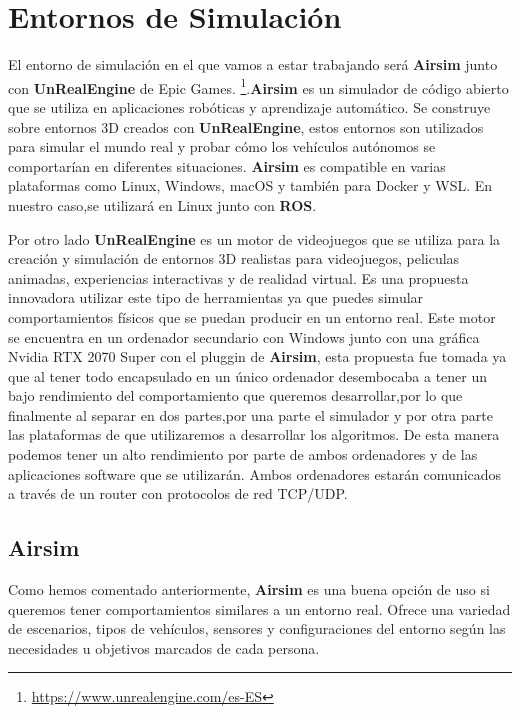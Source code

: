 \section{Entornos de Simulación}
\label{sec:simulación}
El entorno de simulación en el que vamos a estar trabajando será \textbf{Airsim} junto con \textbf{UnRealEngine} de Epic Games. 
\footnote{\url{https://www.unrealengine.com/es-ES}}.\textbf{Airsim} es un simulador de código abierto que se utiliza en aplicaciones robóticas 
y aprendizaje automático.
Se construye sobre entornos 3D creados con \textbf{UnRealEngine}, estos entornos son utilizados para simular el mundo real y probar 
cómo los vehículos autónomos se comportarían en diferentes situaciones. \textbf{Airsim} es compatible en varias plataformas como Linux, Windows, macOS y también para Docker y WSL. En nuestro caso,se utilizará en Linux junto
con \textbf{ROS}. \newline

Por otro lado \textbf{UnRealEngine} es un motor de videojuegos que se utiliza para la creación y simulación de entornos 3D realistas para videojuegos,
peliculas animadas, experiencias interactivas y de realidad virtual. Es una propuesta innovadora utilizar este tipo de herramientas ya que puedes simular comportamientos físicos que se puedan producir en un entorno real. Este motor se encuentra en un ordenador secundario con Windows junto con una gráfica Nvidia RTX 2070 Super con el pluggin de \textbf{Airsim}, 
esta propuesta fue tomada ya que al tener todo encapsulado en un único ordenador
desembocaba a tener un bajo rendimiento del comportamiento que queremos desarrollar,por lo que finalmente al separar en dos partes,por una parte el simulador y por otra parte 
las plataformas de que utilizaremos a desarrollar los algoritmos.
De esta manera podemos tener un alto rendimiento por parte de ambos ordenadores y de las aplicaciones software que se utilizarán. Ambos ordenadores estarán comunicados 
a través de un router con protocolos de red TCP/UDP.


\subsection{Airsim}
\label{sec:airsim}
Como hemos comentado anteriormente, \textbf{Airsim} es una buena opción de uso si queremos tener comportamientos
similares a un entorno real. Ofrece una variedad de escenarios, tipos de vehículos, sensores y configuraciones del entorno 
según las necesidades u objetivos marcados de cada persona. \newline


